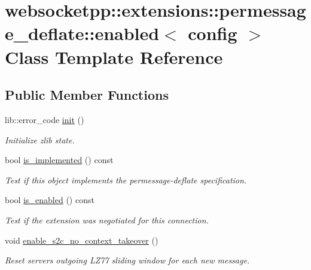 \hypertarget{classwebsocketpp_1_1extensions_1_1permessage__deflate_1_1enabled}{}\section{websocketpp\+:\+:extensions\+:\+:permessage\+\_\+deflate\+:\+:enabled$<$ config $>$ Class Template Reference}
\label{classwebsocketpp_1_1extensions_1_1permessage__deflate_1_1enabled}
\subsection*{Public Member Functions}
\begin{DoxyCompactItemize}
\item 
lib\+::error\+\_\+code \hyperlink{classwebsocketpp_1_1extensions_1_1permessage__deflate_1_1enabled_af54f132b7d21acf79770ccc2008bd334}{init} ()
\begin{DoxyCompactList}\small\item\em Initialize zlib state. \end{DoxyCompactList}\item 
bool \hyperlink{classwebsocketpp_1_1extensions_1_1permessage__deflate_1_1enabled_a76a196b1428865e739fe99e951f03e68}{is\+\_\+implemented} () const
\begin{DoxyCompactList}\small\item\em Test if this object implements the permessage-\/deflate specification. \end{DoxyCompactList}\item 
bool \hyperlink{classwebsocketpp_1_1extensions_1_1permessage__deflate_1_1enabled_a5190a82b1571a94704cef6959ed78ce2}{is\+\_\+enabled} () const
\begin{DoxyCompactList}\small\item\em Test if the extension was negotiated for this connection. \end{DoxyCompactList}\item 
void \hyperlink{classwebsocketpp_1_1extensions_1_1permessage__deflate_1_1enabled_ada853cc81c3e5f5be08e171a7cd662ab}{enable\+\_\+s2c\+\_\+no\+\_\+context\+\_\+takeover} ()
\begin{DoxyCompactList}\small\item\em Reset server\textquotesingle{}s outgoing L\+Z77 sliding window for each new message. \end{DoxyCompactList}\item 

\end{DoxyCompactItemize}
